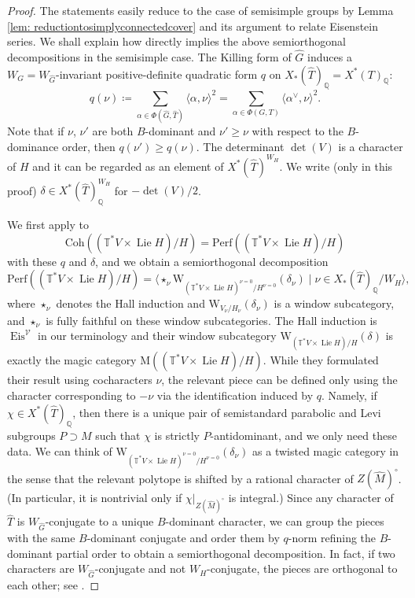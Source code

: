 \documentclass{amsart}
\theoremstyle{definition}
\theoremstyle{remark}
\numberwithin{equation}{section}
\DeclareMathOperator{\Lie}{Lie}
\newcommand{\mc}{\mathcal}
\newcommand{\Q}{\mathbb{Q}}
\newcommand{\wh}{\widehat}
\DeclareMathOperator{\Eis}{\mathrm{Eis}}
\newcommand{\Coh}{\mathrm{Coh}}
\newcommand{\T}{\mathbb{T}}
\newcommand{\Perf}{\mathrm{Perf}}
\newcommand{\M}{\mathrm{M}}
\begin{document}
\begin{proof}
The statements easily reduce to the case of semisimple groups by Lemma \ref{lem: reductiontosimplyconnectedcover} and its argument to relate Eisenstein series. We shall explain how \cite{BuPadurariuToda} directly implies the above semiorthogonal decompositions in the semisimple case. The Killing form of $\wh G$ induces a $W_G=W_{\wh G}$-invariant positive-definite quadratic form $q$ on $X_*(\wh T)_\Q=X^*(T)_\Q$:
\[
q(\nu)\coloneq \sum_{\alpha\in \Phi (\wh G, \wh T)} \langle \alpha, \nu \rangle^2=\sum_{\alpha \in \Phi (G, T)} \langle \alpha^\vee, \nu \rangle^2. 
\]
Note that if $\nu$, $\nu'$ are both $B$-dominant and $\nu'\geq \nu$ with respect to the $B$-dominance order, then $q(\nu')\geq q(\nu)$. The determinant $\det(V)$ is a character of $H$ and it can be regarded as an element of $X^*(\wh  T)^{W_H}$. We write (only in this proof) $\delta\in X^*(\wh  T)^{W_H}_\Q$ for $-\det(V)/2$. 

We first apply \cite[Theorem 2.1.6]{BuPadurariuToda} to 
\[
\Coh((\T^*V \times \Lie H)/H)=\Perf((\T^*V \times \Lie H)/H)
\]
with these $q$ and $\delta$, and we obtain a semiorthogonal decomposition
\[
\Perf((\T^*V \times \Lie H)/H)=\langle \star_\nu \mathrm{W}_{(\T^*V \times \Lie H)^{\nu=0}/H^{\nu=0}}(\delta_\nu)\mid \nu \in X_*(\wh T)_\Q /W_H \rangle,
\]
where $\star_\nu$ denotes the Hall induction and $\mathrm{W}_{V_\nu/H_\nu}(\delta_\nu)$ is a window subcategory, and $\star_\nu$ is fully faithful on these window subcategories. The Hall induction is $\Eis^{\mc V}$ in our terminology and their window subcategory $\mathrm{W}_{(\T^*V \times \Lie H)/H}(\delta)$ is exactly the magic category $\M((\T^*V \times \Lie H)/H)$. While they formulated their result using cocharacters $\nu$, the relevant piece can be defined only using the character corresponding to $-\nu$ via the identification induced by $q$. Namely, if $\chi\in X^*(\wh T)_\Q$, then there is a unique pair of semistandard parabolic and Levi subgroups $P\supset M$ such that $\chi$ is strictly $P$-antidominant, and we only need these data. We can think of $\mathrm{W}_{(\T^*V \times \Lie H)^{\nu=0}/H^{\nu=0}}(\delta_\nu)$ as a twisted magic category in the sense that the relevant polytope is shifted by a rational character of $Z(\wh M)^\circ$. (In particular, it is nontrivial only if $\chi|_{Z(\wh M)^\circ}$ is integral.) Since any character of $\wh T$ is $W_{\wh G}$-conjugate to a unique $B$-dominant character, we can group the pieces with the same $B$-dominant conjugate and order them by $q$-norm refining the $B$-dominant partial order to obtain a semiorthogonal decomposition. In fact, if two characters are $W_{\wh G}$-conjugate and not $W_H$-conjugate, the pieces are orthogonal to each other; see \cite[\S 2.3.2]{BuPadurariuToda}.


\end{proof}
\end{document}
